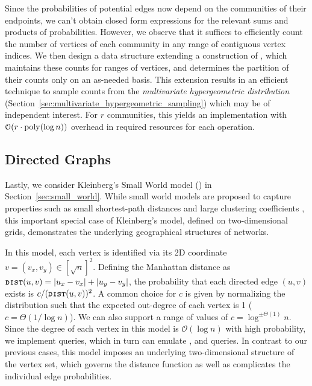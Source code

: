 Since the probabilities of potential edges now depend on the communities of their endpoints,
we can't obtain closed form expressions for the relevant sums and products of probabilities.
However, we observe that it suffices to efficiently count the number of vertices of each community in any range of contiguous vertex indices.
We then design a data structure extending a construction of \cite{huge}, which maintains these counts for ranges of vertices,
and determines the partition of their counts only on an as-needed basis.
This extension results in an efficient technique to sample counts from the \emph{multivariate hypergeometric distribution}
(Section~\ref{sec:multivariate_hypergeometric_sampling}) which may be of independent interest.
For $r$ communities, this yields an implementation with $ \mathcal{O}(r\cdot \mathrm{poly}(\log n))$ overhead in required resources for each operation.




\subsection{Directed Graphs}
\label{sec:directed_graphs}
Lastly, we consider Kleinberg's Small World model (\cite{kleinberg, klein}) in Section~\ref{sec:small_world}.
While small world models are proposed to capture properties such as small shortest-path
distances and large clustering coefficients \cite{watts1998collective},
this important special case of Kleinberg's model, defined on two-dimensional grids, demonstrates the underlying geographical structures of networks.

In this model, each vertex is identified via its 2D coordinate $v = (v_x, v_y) \in [\sqrt{n}]^2$.
Defining the Manhattan distance as $\texttt{\textsc{dist}}(u,v)=|u_x-v_x|+|u_y-v_y|$,
the probability that each directed edge $(u,v)$ exists is $c/(\texttt{\textsc{dist}}(u,v))^{2}$.
A common choice for $c$ is given by normalizing the distribution such that the expected out-degree of each vertex is 1 ($c = \Theta(1/\log n)$).
We can also support a range of values of $c=\log^{\pm\Theta(1)}n$.
Since the degree of each vertex in this model is $\mathcal O(\log n)$ with high probability, we implement  queries,
which in turn can emulate ,  and  queries.
In contrast to our previous cases, this model imposes an underlying two-dimensional structure of the vertex set,
which governs the distance function as well as complicates the individual edge probabilities.

